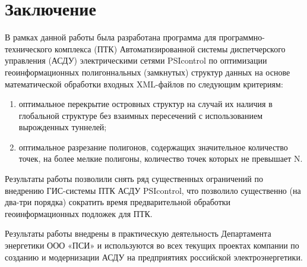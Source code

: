 \section{Заключение}
\label{}

В рамках данной работы была разработана программа для программно-технического комплекса (ПТК) Автоматизированной системы диспетчерского управления (АСДУ) электрическими сетями PSIcontrol по оптимизации геоинформационных полигоннальных (замкнутых) структур данных на основе математической обработки входных XML-файлов по следующим критериям:

\begin{enumerate}
\item оптимальное перекрытие островных структур на случай их наличия в глобальной структуре без взаимных пересечений с использованием вырожденных туннелей;
\item оптимальное разрезание полигонов, содержащих значительное количество точек, на более мелкие полигоны, количество точек которых не превышает N.
\end{enumerate}

Результаты работы позволили снять ряд существенных ограничений по внедрению ГИС-системы ПТК АСДУ PSIcontrol, что позволило существенно (на два-три порядка) сократить время предварительной обработки геоинформационных подложек для ПТК.

Результаты работы внедрены в практическую деятельность Департамента энергетики ООО «ПСИ» и используются во всех текущих проектах компании по созданию и модернизации АСДУ на предприятиях российской электроэнергетики.
